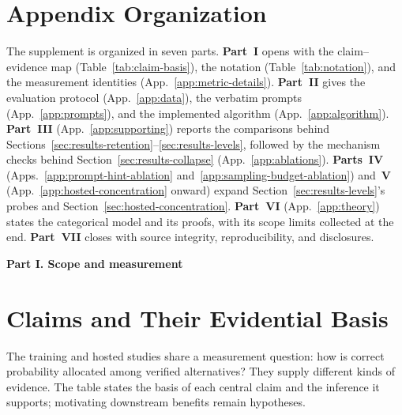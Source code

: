 \documentclass{article}
\newcommand{\1}{\mathbf 1}
\theoremstyle{remark}
\theoremstyle{definition}
\theoremstyle{plain}
\begin{document}
\section*{Appendix Organization}
\label{app:organization}
The supplement is organized in seven parts. \textbf{Part~I} opens with the
claim--evidence map (Table~\ref{tab:claim-basis}), the notation
(Table~\ref{tab:notation}), and the measurement identities
(App.~\ref{app:metric-details}).
\textbf{Part~II} gives the evaluation protocol
(App.~\ref{app:data}), the verbatim prompts (App.~\ref{app:prompts}),
and the implemented algorithm (App.~\ref{app:algorithm}).
\textbf{Part~III} (App.~\ref{app:supporting}) reports the
comparisons behind Sections~\ref{sec:results-retention}--\ref{sec:results-levels},
followed by the mechanism checks behind Section~\ref{sec:results-collapse}
(App.~\ref{app:ablations}). \textbf{Parts~IV}
(Apps.~\ref{app:prompt-hint-ablation} and~\ref{app:sampling-budget-ablation})
and~\textbf{V} (App.~\ref{app:hosted-concentration} onward)
expand Section~\ref{sec:results-levels}'s probes and
Section~\ref{sec:hosted-concentration}. \textbf{Part~VI} (App.~\ref{app:theory}) states the
categorical model and its proofs, with its scope limits collected at the end.
\textbf{Part~VII} closes with source integrity, reproducibility, and disclosures.

\appendix
\onecolumn
\raggedbottom

\clearpage
{}
\begin{center}\large\textbf{Part I. Scope and measurement}\end{center}

\section{Claims and Their Evidential Basis}
\label{app:claim-basis}

The training and hosted studies share a measurement question: how is correct
probability allocated among verified alternatives? They supply different
kinds of evidence. The table states the basis of each central claim and the
inference it supports; motivating downstream benefits remain hypotheses.
\end{document}
